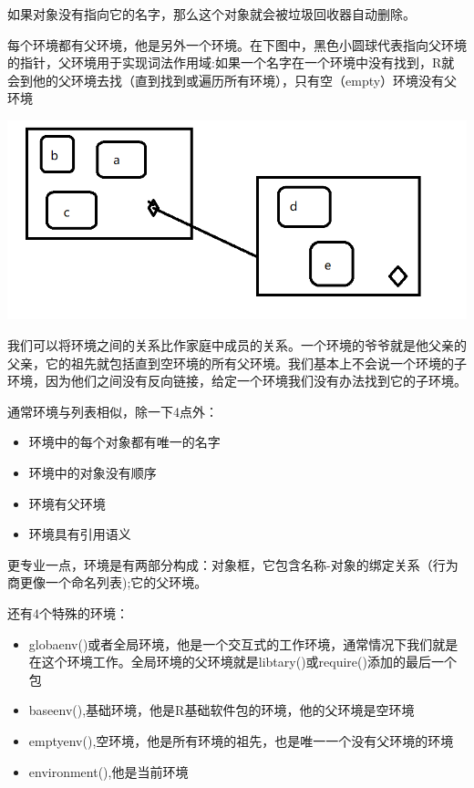 \documentclass[]{book}
\begin{document}
如果对象没有指向它的名字，那么这个对象就会被垃圾回收器自动删除。

每个环境都有父环境，他是另外一个环境。在下图中，黑色小圆球代表指向父环境的指针，父环境用于实现词法作用域:如果一个名字在一个环境中没有找到，R就会到他的父环境去找（直到找到或遍历所有环境），只有空（empty）环境没有父环境

\begin{center}\includegraphics{img/ch7-5} \end{center}

我们可以将环境之间的关系比作家庭中成员的关系。一个环境的爷爷就是他父亲的父亲，它的祖先就包括直到空环境的所有父环境。我们基本上不会说一个环境的子环境，因为他们之间没有反向链接，给定一个环境我们没有办法找到它的子环境。

通常环境与列表相似，除一下4点外：

\begin{itemize}
\item
  环境中的每个对象都有唯一的名字
\item
  环境中的对象没有顺序
\item
  环境有父环境
\item
  环境具有引用语义
\end{itemize}

更专业一点，环境是有两部分构成：对象框，它包含名称-对象的绑定关系（行为商更像一个命名列表);它的父环境。

还有4个特殊的环境：

\begin{itemize}
\item
  globaenv()或者全局环境，他是一个交互式的工作环境，通常情况下我们就是在这个环境工作。全局环境的父环境就是libtary()或require()添加的最后一个包
\item
  baseenv(),基础环境，他是R基础软件包的环境，他的父环境是空环境
\item
  emptyenv(),空环境，他是所有环境的祖先，也是唯一一个没有父环境的环境
\item
  environment(),他是当前环境
\end{itemize}
\end{document}
